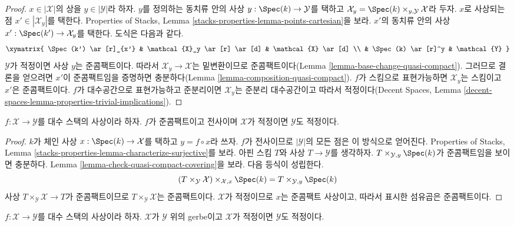 \begin{proof}
$x \in |\mathcal{X}|$의 상을 $y \in |\mathcal{Y}|$라 하자. $y$를
정의하는 동치류 안의 사상 $y : \Spec(k) \to \mathcal{Y}$를 택하고
$\mathcal{X}_y = \Spec(k) \times_{y, \mathcal{Y}} \mathcal{X}$라 두자.
$x$로 사상되는 점 $x' \in |\mathcal{X}_y|$를 택한다. Properties of
Stacks, Lemma \ref{stacks-properties-lemma-points-cartesian}을 보라.
$x'$의 동치류 안의 사상 $x' : \Spec(k') \to \mathcal{X}_y$를 택한다.
도식은 다음과 같다.
$$
\xymatrix{
\Spec(k') \ar[r]_{x'} &
\mathcal{X}_y \ar[r] \ar[d] &
\mathcal{X} \ar[d] \\
&
\Spec(k) \ar[r]^y &
\mathcal{Y}
}
$$
$\mathcal{Y}$가 적정이면 사상 $y$는 준콤팩트이다. 따라서
$\mathcal{X}_y \to \mathcal{X}$는 밑변환이므로 준콤팩트이다(Lemma
\ref{lemma-base-change-quasi-compact}). 그러므로 결론을 얻으려면 $x'$이
준콤팩트임을 증명하면 충분하다(Lemma
\ref{lemma-composition-quasi-compact}). $f$가 스킴으로 표현가능하면
$\mathcal{X}_y$는 스킴이고 $x'$은 준콤팩트이다. $f$가 대수공간으로
표현가능하고 준분리이면 $\mathcal{X}_y$는 준분리 대수공간이고 따라서
적정이다(Decent Spaces, Lemma
\ref{decent-spaces-lemma-properties-trivial-implications}).
\end{proof}

\begin{lemma}
\label{lemma-qc-decent}
$f : \mathcal{X} \to \mathcal{Y}$를 대수 스택의 사상이라 하자. $f$가
준콤팩트이고 전사이며 $\mathcal{X}$가 적정이면 $\mathcal{Y}$도 적정이다.
\end{lemma}

\begin{proof}
$k$가 체인 사상 $x : \Spec(k) \to \mathcal{X}$를 택하고
$y = f \circ x$라 쓰자. $f$가 전사이므로 $|\mathcal{Y}|$의 모든 점은 이
방식으로 얻어진다. Properties of Stacks, Lemma
\ref{stacks-properties-lemma-characterize-surjective}를 보라. 아핀 스킴
$T$와 사상 $T \to \mathcal{Y}$를 생각하자.
$T \times_{\mathcal{Y}, y} \Spec(k)$가 준콤팩트임을 보이면 충분하다.
Lemma \ref{lemma-check-quasi-compact-covering}을 보라. 다음 등식이 성립한다.
$$
(T \times_{\mathcal{Y}} \mathcal{X}) \times_{\mathcal{X}, x} \Spec(k) =
T \times_{\mathcal{Y}, y} \Spec(k)
$$
사상 $T \times_{\mathcal{Y}} \mathcal{X} \to T$가 준콤팩트이므로
$T \times_\mathcal{Y} \mathcal{X}$는 준콤팩트이다. $\mathcal{X}$가
적정이므로 $x$는 준콤팩트 사상이고, 따라서 표시한 섬유곱은 준콤팩트이다.
\end{proof}

\begin{lemma}
\label{lemma-gerbe-decent}
$f : \mathcal{X} \to \mathcal{Y}$를 대수 스택의 사상이라 하자.
$\mathcal{X}$가 $\mathcal{Y}$ 위의 gerbe이고 $\mathcal{X}$가 적정이면
$\mathcal{Y}$도 적정이다.
\end{lemma}

